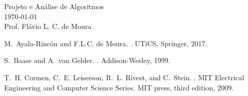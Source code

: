 \documentclass[12pt]{article}
\begin{document}

\begin{center}
  \Large Projeto e Análise de Algoritmos\\ 
  \normalsize \today \\ 
  Prof. Flávio L. C. de Moura
\end{center}





\begin{thebibliography}{CLRS01}  
M.~Ayala-Rinc\'on and F.L.C. de Moura.
.
\newblock UTiCS, Springer, 2017.

S.~Baase and A.~van Gelder.
.
\newblock Addison-Wesley, 1999.

T.~H. Cormen, C.~E. Leiserson, R.~L. Rivest, and C.~Stein.
.
\newblock MIT Electrical Engineering and Computer Science Series. MIT press,
  third edition, 2009.
\end{thebibliography}
\end{document}
